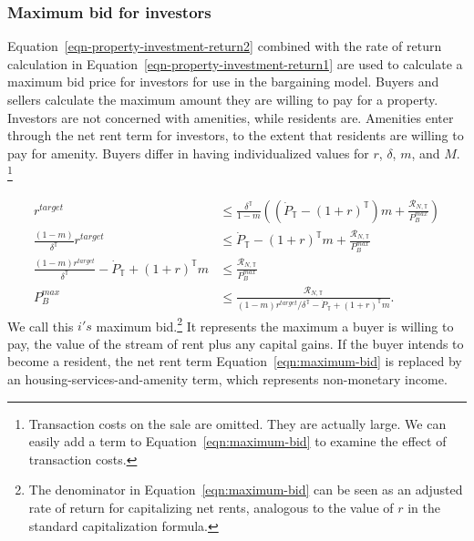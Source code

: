 {\subsubsection{Maximum bid for investors}
Equation~\ref{eqn-property-investment-return2} combined with the rate of return calculation in Equation~\ref{eqn-property-investment-return1} are used to calculate a maximum bid price for investors for use in the bargaining model.
% 
Buyers and sellers calculate the maximum amount they are willing to pay for a property.  Investors are not concerned with amenities, while residents are. %
Amenities enter through the net rent term for investors, to the extent that residents are willing to pay for amenity. Buyers differ in having individualized values for $r$, $\delta$, $m$, and $M$.%
\footnote{Transaction costs on the sale are omitted. They are actually large. We can easily add a term to  Equation~\ref{eqn:maximum-bid} to examine the effect of transaction costs.} %

\begin{align}
r^{target}& \le \frac{\delta^\mathbb{T}}{1-m} \left((\dot P_\mathbb{T} - (1+r)^\mathbb{T})m  + \frac{\mathcal{R}_{N, \mathbb{T}}}{P_B^{max}}\right)\nonumber\\
\frac{(1-m)}{\delta^\mathbb{T}}r^{target} &\le \dot P_\mathbb{T} - (1+r)^\mathbb{T}m  +   \frac{\mathcal{R}_{N, \mathbb{T}}}{P_B^{max}} \nonumber\\
\frac{(1-m)r^{target}}{\delta^\mathbb{T}} - \dot P_\mathbb{T} + (1+r)^\mathbb{T}m &\le  \frac{\mathcal{R}_{N, \mathbb{T}}}{P_B^{max}}\nonumber\\
P_B^{max} &\le  \frac{\mathcal{R}_{N, \mathbb{T}}}{(1-m)r^{target}/\delta^\mathbb{T} - \dot P_\mathbb{T} + (1+r)^\mathbb{T}m}. \label{eqn:maximum-bid}
\end{align}
We call this  $i's$ maximum bid.\footnote{The denominator in Equation~\ref{eqn:maximum-bid} can be seen as an adjusted rate of return for capitalizing net rents, analogous to the value of $r$ in the standard capitalization formula.} 
It represents the maximum a buyer is willing to pay, the value of the stream of rent plus any capital gains. %
If the buyer intends to become a resident, the net rent term Equation~\ref{eqn:maximum-bid} is replaced by an housing-services-and-amenity term, which represents non-monetary income. %

}
